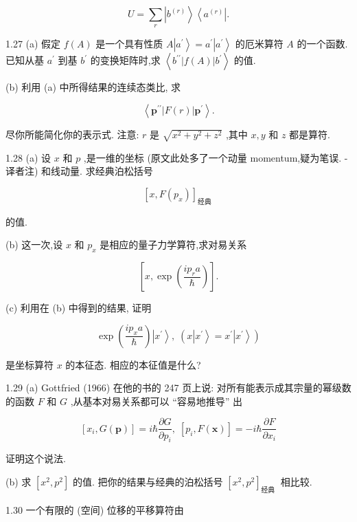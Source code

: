 \documentclass[lang=cn,newtx,10pt,scheme=chinese,thmcnt=section]{elegantbook}
\begin{document}
$$
U = \mathop{\sum }\limits_{r}\left| {b}^{\left( r\right) }\right\rangle \left\langle {a}^{\left( r\right) }\right| .
$$

1.27 (a) 假定 $f\left( A\right)$ 是一个具有性质 $A\left| {a}^{\prime }\right\rangle = {a}^{\prime }\left| {a}^{\prime }\right\rangle$ 的厄米算符 $A$ 的一个函数. 已知从基 ${a}^{\prime }$ 到基 ${b}^{\prime }$ 的变换矩阵时,求 $\left\langle {{b}^{\prime \prime }\left| {f\left( A\right) }\right| {b}^{\prime }}\right\rangle$ 的值.

(b) 利用 (a) 中所得结果的连续态类比, 求

$$
\left\langle {{\mathbf{p}}^{\prime \prime }\left| {F\left( r\right) }\right| {\mathbf{p}}^{\prime }}\right\rangle \text{.}
$$

尽你所能简化你的表示式. 注意: $r$ 是 $\sqrt{{x}^{2} + {y}^{2} + {z}^{2}}$ ,其中 $x, y$ 和 $z$ 都是算符.

1.28 (a) 设 $x$ 和 $p$ ,是一维的坐标 (原文此处多了一个动量 momentum,疑为笔误. - 译者注) 和线动量. 求经典泊松括号

$$
{\left\lbrack x, F\left( {p}_{x}\right) \right\rbrack }_{\text{经典 }}
$$

的值.

(b) 这一次,设 $x$ 和 ${p}_{x}$ 是相应的量子力学算符,求对易关系

$$
\left\lbrack {x,\exp \left( \frac{i{p}_{r}a}{\hbar }\right) }\right\rbrack .
$$

(c) 利用在 (b) 中得到的结果, 证明

$$
\exp \left( \frac{i{p}_{x}a}{\hbar }\right) \left| {x}^{\prime }\right\rangle ,\;\left( {x\left| {x}^{\prime }\right\rangle = {x}^{\prime }\left| {x}^{\prime }\right\rangle }\right)
$$

是坐标算符 $x$ 的本征态. 相应的本征值是什么?

1.29 (a) Gottfried (1966) 在他的书的 247 页上说: 对所有能表示成其宗量的幂级数的函数 $F$ 和 $G$ ,从基本对易关系都可以 “容易地推导” 出

$$
\left\lbrack {{x}_{i}, G\left( \mathbf{p}\right) }\right\rbrack = i\hbar \frac{\partial G}{\partial {p}_{i}},\;\left\lbrack {{p}_{i}, F\left( \mathbf{x}\right) }\right\rbrack = - i\hbar \frac{\partial F}{\partial {x}_{i}}
$$

证明这个说法.

(b) 求 $\left\lbrack {{x}^{2},{p}^{2}}\right\rbrack$ 的值. 把你的结果与经典的泊松括号 ${\left\lbrack {x}^{2},{p}^{2}\right\rbrack }_{\text{经典 }}$ 相比较.

1.30 一个有限的 (空间) 位移的平移算符由
\end{document}
